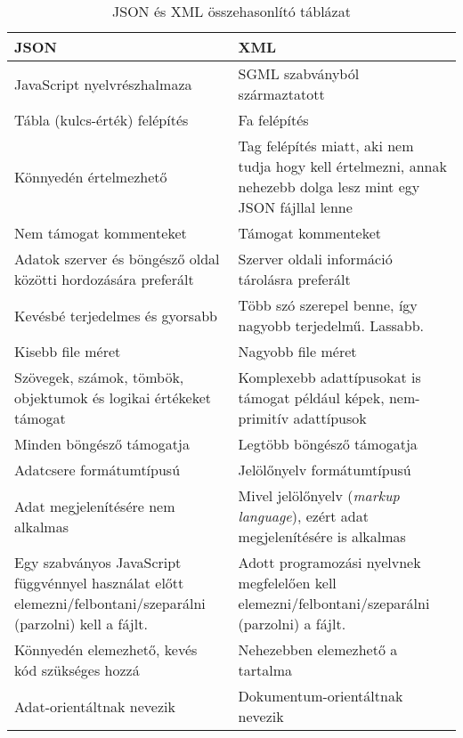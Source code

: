 \begin{table}[H]
	\centering
	\caption{JSON és XML összehasonlító táblázat}
	\label{tab:jsonandxml}
	\medskip
	\begin{tabular}{|p{7.2cm}|p{7.2cm}|}
		\hline
		\textbf{JSON} & \textbf{XML} \\
		\hline
		JavaScript nyelvrészhalmaza & SGML szabványból származtatott \\
		\hline
		Tábla (kulcs-érték) felépítés & Fa felépítés \\
		\hline
		Könnyedén értelmezhető & Tag felépítés miatt, aki nem tudja hogy kell értelmezni, annak nehezebb dolga lesz mint egy JSON fájllal lenne\\
		\hline
		Nem támogat kommenteket & Támogat kommenteket \\
		\hline
		Adatok szerver és böngésző oldal közötti hordozására preferált & Szerver oldali információ tárolásra preferált\\
		\hline
		Kevésbé terjedelmes és gyorsabb & Több szó szerepel benne, így nagyobb terjedelmű. Lassabb.\\
		\hline
		Kisebb file méret & Nagyobb file méret\\
		\hline
		Szövegek, számok, tömbök, objektumok és logikai értékeket támogat & Komplexebb adattípusokat is támogat például képek, nem-primitív adattípusok\\
		\hline
		Minden böngésző támogatja & Legtöbb böngésző támogatja\\
		\hline
		Adatcsere formátumtípusú & Jelölőnyelv formátumtípusú\\
		\hline
		Adat megjelenítésére nem alkalmas & Mivel jelölőnyelv (\textit{markup language}), ezért adat megjelenítésére is alkalmas\\
		\hline
		Egy szabványos JavaScript függvénnyel használat előtt elemezni/felbontani/szeparálni (parzolni) kell a fájlt. & Adott programozási nyelvnek megfelelően kell elemezni/felbontani/szeparálni (parzolni) a fájlt.\\
		\hline
		Könnyedén elemezhető, kevés kód szükséges hozzá & Nehezebben elemezhető a tartalma\\
		\hline
		Adat-orientáltnak nevezik & Dokumentum-orientáltnak nevezik\\
		\hline
	\end{tabular}
\end{table}



